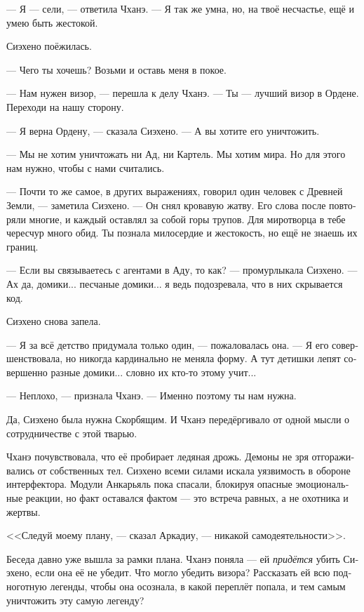 \documentclass[a4paper,12pt,fleqn]{book}\usepackage{polyglossia}\setdefaultlanguage[babelshorthands=true]{russian}\setotherlanguage{english}\defaultfontfeatures{Ligatures=TeX,Mapping=tex-text}\usepackage{xcolor}\newcommand{\ml}[3]{#2}
\newcommand{\textspace}{\vspace{1em}{\centering\Large\bfseries<...>\par}\vspace{1em}}
\begin{document}
{--- Я --- сели, --- ответила Чханэ.
--- Я так же умна, но, на твоё несчастье, ещё и умею быть жестокой.

Сиэхено поёжилась.

--- Чего ты хочешь?
Возьми и оставь меня в покое.

--- Нам нужен визор, --- перешла к делу Чханэ.
--- Ты --- лучший визор в Ордене.
Переходи на нашу сторону.

--- Я верна Ордену, --- сказала Сиэхено.
--- А вы хотите его уничтожить.

--- Мы не хотим уничтожать ни Ад, ни Картель.
Мы хотим мира.
Но для этого нам нужно, чтобы с нами считались.

--- Почти то же самое, в других выражениях, говорил один человек с Древней Земли, --- заметила Сиэхено.
--- Он снял кровавую жатву.
Его слова после повторяли многие, и каждый оставлял за собой горы трупов.
Для миротворца в тебе чересчур много обид.
Ты познала милосердие и жестокость, но ещё не знаешь их границ.

\textspace

--- Если вы связываетесь с агентами в Аду, то как? --- промурлыкала Сиэхено.
--- Ах да, домики... песчаные домики... я ведь подозревала, что в них скрывается код.

Сиэхено снова запела.

--- Я за всё детство придумала только один, --- пожаловалась она.
--- Я его совершенствовала, но никогда кардинально не меняла форму.
А тут детишки лепят совершенно разные домики... словно их кто-то этому учит...

--- Неплохо, --- признала Чханэ.
--- Именно поэтому ты нам нужна.

Да, Сиэхено была нужна Скорбящим.
И Чханэ передёргивало от одной мысли о сотрудничестве с этой тварью.

\textspace

Чханэ почувствовала, что её пробирает ледяная дрожь.
Демоны не зря отгораживались от собственных тел.
Сиэхено всеми силами искала уязвимость в обороне интерфектора.
Модули Анкарьяль пока спасали, блокируя опасные эмоциональные реакции, но факт оставался фактом --- это встреча равных, а не охотника и жертвы.

<<Следуй моему плану, --- сказал Аркадиу, --- никакой самодеятельности>>.

Беседа давно уже вышла за рамки плана.
Чханэ поняла --- ей \emph{придётся} убить Сиэхено, если она её не убедит.
Что могло убедить визора?
Рассказать ей всю подноготную легенды, чтобы она осознала, в какой переплёт попала, и тем самым уничтожить эту самую легенду?

}
\end{document}
